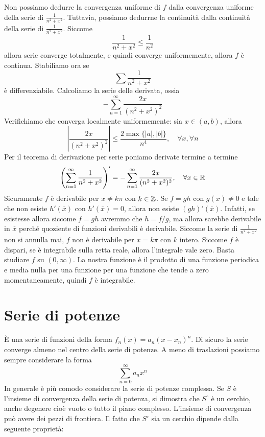 \documentclass[a4paper]{article}
\begin{document}
\begin{snippetsolution}{}
    Non possiamo dedurre la convergenza uniforme di \(f\) dalla convergenza uniforme della serie
    di \(\frac{1}{n^2 + x^2}\). Tuttavia, possiamo dedurrne la continuità dalla continuità della serie di \(\frac{1}{n^2 + x^2}\).
    Siccome \[
        \frac{1}{n^2 + x^2} \leq \frac{1}{n^2}
    \]
    allora serie converge totalmente, e quindi converge uniformemente, allora \(f\) è continua.
    Stabiliamo ora se
    \[
        \sum \frac{1}{n^2 + x^2}
    \]
    è differenziabile.
    Calcoliamo la serie delle derivata, ossia
    \[
        - \sum_{n=1}^\infty \frac{2x}{(n^2 + x^2)^2}
    \]
    Verifichiamo che converga localmente uniformemente: sia \(x\in(a,b)\), allora
    \[
        \left|
            \frac{2x}{(n^2 + x^2)^2}
        \right| \leq \frac{
            2\max\{|a|, |b|\}
        }{n^4}, \quad \forall x, \forall n
    \]
    Per il teorema di derivazione per serie poniamo derivate termine a termine
    \[
        \left(
            \sum_{n=1}^\infty \frac{1}{n^2 + x^2}
        \right)' = - \sum_{n=1}^\infty \frac{2x}{(n^2 + x^2)^2}, \quad \forall x \in \mathbb{R}
    \]
    Sicuramente \(f\) è derivabile per \(x\neq k\pi\) con \(k\in\mathbb{Z}\).
    Se \(f = gh\) con \(g(x) \neq 0\) e tale che non esiste \(h'(\overline x)\) con
    \(h'(\overline x) = 0\), allora non esiste \((gh)'(\overline x)\).
    Infatti, se esistesse allora siccome \(f = gh\) avremmo che \(h = f/g\),
    ma allora sarebbe derivabile in \(\overline x\) perché quoziente di funzioni derivabili è derivabile.
    Siccome la serie di \(\frac{1}{n^2 + x^2}\) non si annulla mai, \(f\) non è derivabile
    per \(x = k\pi\) con \(k\) intero.
    Siccome \(f\) è dispari, se è integrabile sulla retta reale, allora l'integrale vale zero.
    Basta studiare \(f\) su \((0, \infty)\).
    La nostra funzione è il prodotto di una funzione periodica e media nulla per una funzione per una funzione che tende
    a zero momentaneamente, quindi \(f\) è integrabile.
\end{snippetsolution}


\pagebreak

\section{Serie di potenze}

È una serie di funzioni della forma \(f_n(x) = a_n(x-x_n)^n\).
Di sicuro la serie converge almeno nel centro della serie di potenze.
A meno di traslazioni possiamo sempre considerare la forma
\[
    \sum_{n=0}^\infty a_n x^n
\]
In generale è più comodo considerare la serie di potenze complessa.
Se \(S\) è l'insieme di convergenza della serie di potenza,
si dimostra che \(S^\circ\) è un cerchio, anche degenere cioè vuoto o tutto il piano complesso.
L'insieme di convergenza può avere dei pezzi di frontiera.
Il fatto che \(S^\circ\)
sia un cerchio dipende dalla seguente proprietà:
\end{document}
